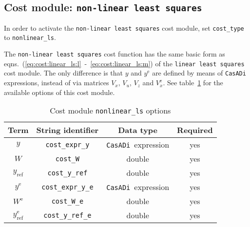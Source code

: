 \documentclass[english]{article}
\newcommand{\code}[1]{\texttt{#1}}
\newcommand{\casadi}{\texttt{CasADi}}
\newcommand{\ind}[1]{_{\textrm{#1}}}
\newcommand{\terminal}{^{\textrm{e}}}
\newcommand{\mandatory}{yes}
\begin{document}
\subsection{Cost module: \code{non-linear least squares}}\label{sec:cost:nonlinear_ls}
%
In order to activate the \code{non-linear least squares} cost module, set \code{cost\_type} to \code{nonlinear\_ls}.

The \code{non-linear least squares} cost function has the same basic form as eqns.~(\ref{eq:cost:linear_ls:l}~-~\ref{eq:cost:linear_ls:m}) of the \code{linear least squares} cost module.
The only difference is that $ y $ and $ y\terminal $ are defined by means of \casadi{} expressions, instead of via matrices $ V_x $, $ V_u $, $ V_z $ and $ V_x\terminal $.
%
See table~\ref{tab:cost:nonlinear_ls} for the available options of this cost module.
%
\begin{table}[h!]
    \centering
    \caption{Cost module \code{nonlinear\_ls} options} \label{tab:cost:nonlinear_ls}
    \begin{tabular}{cccc}
        \toprule
        Term & String identifier & Data type & Required \\ \midrule
        $ y $ & \code{cost\_expr\_y}    & \casadi~expression  & \mandatory   \\
        $ W $ & \code{cost\_W}    & double  & \mandatory   \\
        $ y\ind{ref} $ & \code{cost\_y\_ref}    & double & \mandatory    \\ [1em]
        $ y\terminal $ & \code{cost\_expr\_y\_e}    & \casadi~expression  & \mandatory   \\
        $ W\terminal $ & \code{cost\_W\_e}    & double & \mandatory   \\
        $ y\ind{ref}\terminal $ & \code{cost\_y\_ref\_e}    & double  & \mandatory   \\
        \bottomrule
    \end{tabular}
\end{table}
%
\end{document}
